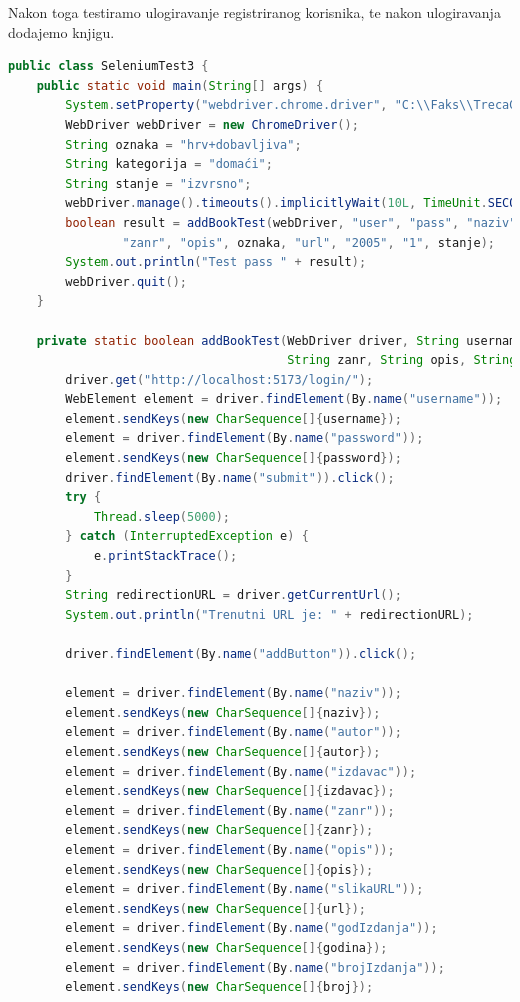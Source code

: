 			Nakon toga testiramo ulogiravanje registriranog korisnika, te nakon ulogiravanja dodajemo knjigu.
                  \begin{lstlisting}[language=Java, label=lst:java_example, basicstyle=\scriptsize, baselinestretch=0.9]
 public class SeleniumTest3 {
    public static void main(String[] args) {
        System.setProperty("webdriver.chrome.driver", "C:\\Faks\\TrecaGod\\PROGI\\Projekt\\chromedriver-win64\\chromedriver.exe");
        WebDriver webDriver = new ChromeDriver();
        String oznaka = "hrv+dobavljiva";
        String kategorija = "domaći";
        String stanje = "izvrsno";
        webDriver.manage().timeouts().implicitlyWait(10L, TimeUnit.SECONDS);
        boolean result = addBookTest(webDriver, "user", "pass", "naziv", "autor", "izdavac", kategorija,
                "zanr", "opis", oznaka, "url", "2005", "1", stanje);
        System.out.println("Test pass " + result);
        webDriver.quit();
    }

    private static boolean addBookTest(WebDriver driver, String username, String password, String naziv, String autor, String izdavac, String kategorija,
                                       String zanr, String opis, String oznaka, String url, String godina, String broj, String stanje){
        driver.get("http://localhost:5173/login/");
        WebElement element = driver.findElement(By.name("username"));
        element.sendKeys(new CharSequence[]{username});
        element = driver.findElement(By.name("password"));
        element.sendKeys(new CharSequence[]{password});
        driver.findElement(By.name("submit")).click();
        try {
            Thread.sleep(5000);
        } catch (InterruptedException e) {
            e.printStackTrace();
        }
        String redirectionURL = driver.getCurrentUrl();
        System.out.println("Trenutni URL je: " + redirectionURL);

        driver.findElement(By.name("addButton")).click();

        element = driver.findElement(By.name("naziv"));
        element.sendKeys(new CharSequence[]{naziv});
        element = driver.findElement(By.name("autor"));
        element.sendKeys(new CharSequence[]{autor});
        element = driver.findElement(By.name("izdavac"));
        element.sendKeys(new CharSequence[]{izdavac});
        element = driver.findElement(By.name("zanr"));
        element.sendKeys(new CharSequence[]{zanr});
        element = driver.findElement(By.name("opis"));
        element.sendKeys(new CharSequence[]{opis});
        element = driver.findElement(By.name("slikaURL"));
        element.sendKeys(new CharSequence[]{url});
        element = driver.findElement(By.name("godIzdanja"));
        element.sendKeys(new CharSequence[]{godina});
        element = driver.findElement(By.name("brojIzdanja"));
        element.sendKeys(new CharSequence[]{broj});


\end{lstlisting}

